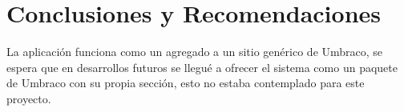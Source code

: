 \chapter*{Conclusiones y Recomendaciones}
\par La aplicación funciona como un agregado a un sitio genérico de Umbraco, se espera que en desarrollos futuros se llegué a ofrecer el sistema como un paquete de Umbraco con su propia sección, esto no estaba contemplado para este proyecto.
